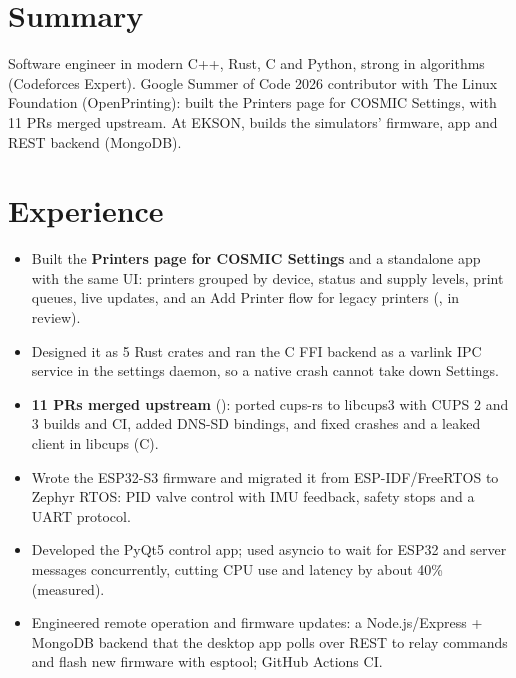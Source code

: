 \documentclass[10pt]{article}
\begin{document}

\section*{Summary}
Software engineer in modern C++, Rust, C and Python, strong in algorithms (Codeforces Expert). Google Summer of Code 2026 contributor with The Linux Foundation (OpenPrinting): built the Printers page for COSMIC Settings, with 11 PRs merged upstream. At EKSON, builds the simulators' firmware, app and REST backend (MongoDB).

\section*{Experience}
\begin{itemize}
  \item Built the \textbf{Printers page for COSMIC Settings} and a standalone app with the same UI: printers grouped by device, status and supply levels, print queues, live updates, and an Add Printer flow for legacy printers (, in review).
  \item Designed it as 5 Rust crates and ran the C FFI backend as a varlink IPC service in the settings daemon, so a native crash cannot take down Settings.
  \item \textbf{11 PRs merged upstream} (): ported cups-rs to libcups3 with CUPS 2 and 3 builds and CI, added DNS-SD bindings, and fixed crashes and a leaked client in libcups (C).
\end{itemize}
\begin{itemize}
  \item Wrote the ESP32-S3 firmware and migrated it from ESP-IDF/FreeRTOS to Zephyr RTOS: PID valve control with IMU feedback, safety stops and a UART protocol.
  \item Developed the PyQt5 control app; used asyncio to wait for ESP32 and server messages concurrently, cutting CPU use and latency by about 40\% (measured).
  \item Engineered remote operation and firmware updates: a Node.js/Express + MongoDB backend that the desktop app polls over REST to relay commands and flash new firmware with esptool; GitHub Actions CI.
\end{itemize}
\end{document}
